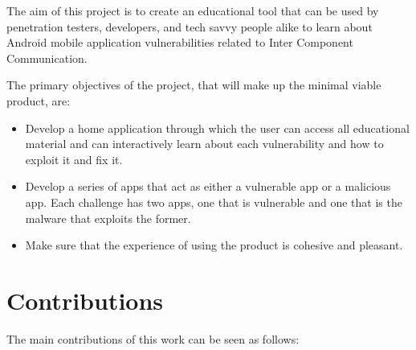         The aim of this project is to create an educational tool that can be used by penetration testers, developers, and tech savvy people alike to learn about Android mobile application vulnerabilities related to Inter Component Communication.
        
        The primary objectives of the project, that will make up the minimal viable product, are:
        
        \begin{itemize}
            \item Develop a home application through which the user can access all educational material and can interactively learn about each vulnerability and how to exploit it and fix it.
            \item Develop a series of apps that act as either a vulnerable app or a malicious app. Each challenge has two apps, one that is vulnerable and one that is the malware that exploits the former.
            \item Make sure that the experience of using the product is cohesive and pleasant.
        \end{itemize}
	
	\section{Contributions} 
		\label{sec:intro_contribs} 
		
		The main contributions of this work can be seen as follows:
		
